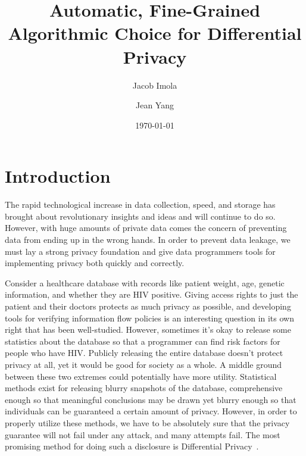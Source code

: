 \documentclass[11pt]{report}
\begin{document}
\title{Automatic, Fine-Grained Algorithmic Choice for Differential Privacy}
\date{\today}
\author[1]{Jacob Imola}
\author[1]{Jean Yang}
\maketitle
{}

\chapter{Introduction}\label{ch:intro}
The rapid technological increase in data collection, speed, and storage has brought about revolutionary insights and ideas and will continue to do so. However, with huge amounts of private data comes the concern of preventing data from ending up in the wrong hands. In order to prevent data leakage, we must lay a strong privacy foundation and give data programmers tools for implementing privacy both quickly and correctly.

Consider a healthcare database with records like patient weight, age, genetic information, and whether they are HIV positive. Giving access rights to just the patient and their doctors protects as much privacy as possible, and developing tools for verifying information flow policies is an interesting question in its own right that has been well-studied. However, sometimes it's okay to release some statistics about the database so that a programmer can find risk factors for people who have HIV. Publicly releasing the entire database doesn't protect privacy at all, yet it would be good for society as a whole. A middle ground between these two extremes could potentially have more utility. Statistical methods exist for releasing blurry snapshots of the database, comprehensive enough so that meaningful conclusions may be drawn yet blurry enough so that individuals can be guaranteed a certain amount of privacy. However, in order to properly utilize these methods, we have to be absolutely sure that the privacy guarantee will not fail under any attack, and many attempts fail. The most promising method for doing such a disclosure is Differential Privacy~\cite{Dwork:2006}.
\end{document}
